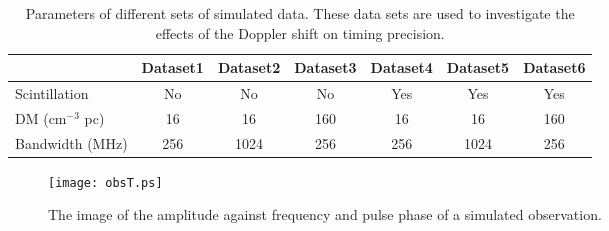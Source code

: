 \documentclass[useAMS,usenatbib]{mn2e}
\begin{document}
\begin{table}
\begin{center}
\caption{Parameters of different sets of simulated data. These data sets are used to
investigate the effects of the Doppler shift on timing precision.}
\label{simT1}
\begin{tabular}{lcccccc}
\hline
                  &    Dataset1   &   Dataset2    &   Dataset3    &   Dataset4   &   Dataset5   &   Dataset6    \\
\hline                                                                                                         
Scintillation     &     No        &   No          &   No          &    Yes       &    Yes       &    Yes        \\
DM (cm$^{-3}$ pc) &     16        &   16          &   160         &    16        &    16        &    160        \\
Bandwidth (MHz)   &     256       &   1024        &   256         &    256       &    1024      &    256        \\
\hline
\end{tabular}
\end{center}
\end{table}

\begin{figure}
\begin{center}
\texttt{[image: obsT.ps]}
\end{center}
\caption{The image of the amplitude against frequency and pulse phase of a simulated 
observation.}
\label{obs1}
\end{figure}
\end{document}
